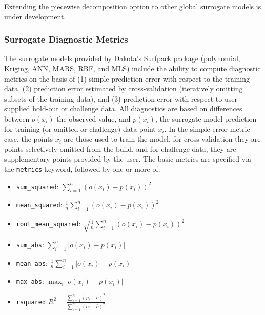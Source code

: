 Extending the piecewise decomposition option to other global surrogate models is under development. 

\subsubsection{Surrogate Diagnostic Metrics}\label{models:surf:diagnostics}

The surrogate models provided by Dakota's Surfpack package
(polynomial, Kriging, ANN, MARS, RBF, and MLS) include the ability to
compute diagnostic metrics on the basis of (1) simple prediction error
with respect to the training data, (2) prediction error estimated by
cross-validation (iteratively omitting subsets of the training data),
and (3) prediction error with respect to user-supplied hold-out or
challenge data.  All diagnostics are based on differences between
$o(x_i)$ the observed value, and $p(x_i)$, the surrogate model
prediction for training (or omitted or challenge) data point $x_i$.
In the simple error metric case, the points $x_i$ are those used to
train the model, for cross validation they are points selectively
omitted from the build, and for challenge data, they are supplementary
points provided by the user.  The basic metrics are specified via the
{\tt metrics} keyword, followed by one or more of:

\begin{itemize}
\item {\tt sum\_squared}: $\sum_{i=1}^{n}{ \left( o(x_i) - p(x_i) \right) ^2}$

\item {\tt mean\_squared}: $\frac{1}{n}\sum_{i=1}^{n}{ \left( o(x_i) - p(x_i) \right) ^2}$

\item {\tt root\_mean\_squared}: $\sqrt{\frac{1}{n}\sum_{i=1}^{n}{ \left( o(x_i) - p(x_i) \right) ^2}}$

\item {\tt sum\_abs}: $\sum_{i=1}^{n}{ \left| o(x_i) - p(x_i) \right| }$

\item {\tt mean\_abs}: $\frac{1}{n}\sum_{i=1}^{n}{ \left| o(x_i) - p(x_i) \right| }$

\item {\tt max\_abs}: $\max_i \left| o(x_i) - p(x_i) \right|$

\item {\tt rsquared} $ R^2 = \frac{\sum_{i=1}^{n}{\left(p_i -
        \bar{o}\right)^2}}{ \sum_{i=1}^{n}{\left(o_i -
        \bar{o}\right)^2}}$
\end{itemize}

